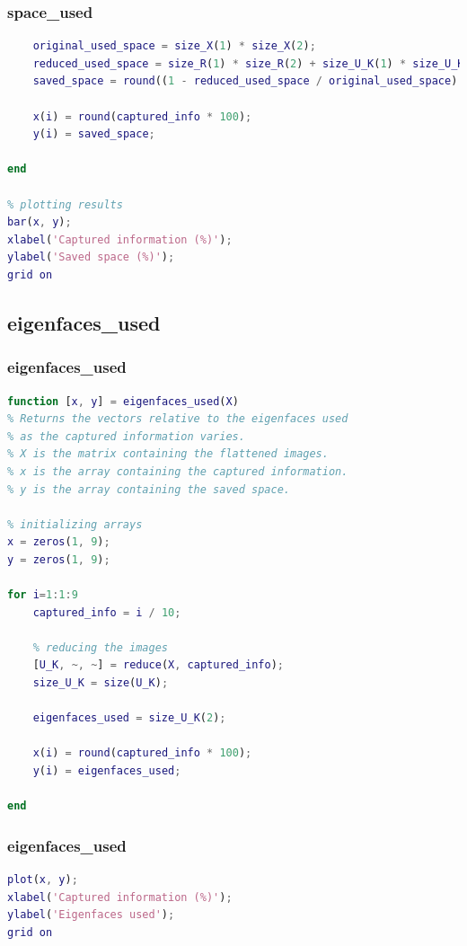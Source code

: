 \documentclass[10pt]{beamer}
\begin{document}
\begin{frame}[fragile]
    \frametitle{space\_used}

    \begin{lstlisting}[language=Matlab, numbers=none]
    % computing used space, reduced space and saved space
    original_used_space = size_X(1) * size_X(2);
    reduced_used_space = size_R(1) * size_R(2) + size_U_K(1) * size_U_K(2) + size_M;
    saved_space = round((1 - reduced_used_space / original_used_space) * 100);

    x(i) = round(captured_info * 100);
    y(i) = saved_space;

end

% plotting results
bar(x, y);
xlabel('Captured information (%)');
ylabel('Saved space (%)');
grid on

    \end{lstlisting}
    
\end{frame}

\subsection{eigenfaces\_used}
\begin{frame}[fragile]
    \frametitle{eigenfaces\_used}

    \begin{lstlisting}[language=Matlab, numbers=none]
function [x, y] = eigenfaces_used(X)
% Returns the vectors relative to the eigenfaces used 
% as the captured information varies.
% X is the matrix containing the flattened images.
% x is the array containing the captured information.
% y is the array containing the saved space.

% initializing arrays
x = zeros(1, 9);
y = zeros(1, 9);

for i=1:1:9
    captured_info = i / 10;
    
    % reducing the images
    [U_K, ~, ~] = reduce(X, captured_info);
    size_U_K = size(U_K);
    
    eigenfaces_used = size_U_K(2);

    x(i) = round(captured_info * 100);
    y(i) = eigenfaces_used;

end
    \end{lstlisting}
    
\end{frame}

\begin{frame}[fragile]
    \frametitle{eigenfaces\_used}

    \begin{lstlisting}[language=Matlab, numbers=none]
% plotting result
plot(x, y);
xlabel('Captured information (%)');
ylabel('Eigenfaces used');
grid on

    \end{lstlisting}
    
\end{frame}
\end{document}
